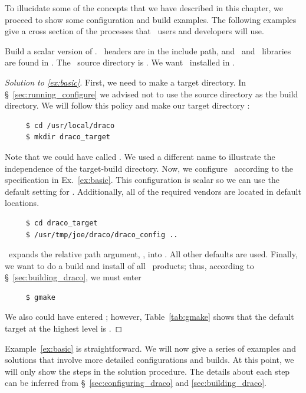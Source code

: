 To illucidate some of the concepts that we have described in this
chapter, we proceed to show some configuration and build examples.
The following examples give a cross section of the processes that
\draco\ users and developers will use.
\begin{cexa}
  \label{ex:basic}
  Build a scalar version of \draco.  \sprng\ headers are in the
   include path, and \sprng\ and \pcglib\ libraries are
  found in \ldlib.  The \draco\ source directory is
  .  We want \draco\ installed in
  .
\end{cexa}
\begin{proof}[Solution to \ref{ex:basic}]
  First, we need to make a target directory.  In
  \S~\ref{sec:running_configure} we advised not to use the source
  directory as the build directory.  We will follow this policy and
  make our target directory :
\begin{verbatim}
     $ cd /usr/local/draco
     $ mkdir draco_target
\end{verbatim}
  Note that we could have called 
  .  We used a different name to illustrate the
  independence of the target-build directory.  Now, we configure
  \draco\ according to the specification in Ex.~\ref{ex:basic}.  This
  configuration is scalar so we can use the default setting for
  \cfour.  Additionally, all of the required vendors are located in
  default locations.
\begin{verbatim}
     $ cd draco_target
     $ /usr/tmp/joe/draco/draco_config ..
\end{verbatim}
  \dracoconf\ expands the relative path argument, , into
  .  All other defaults are used.
  Finally, we want to do a build and install of all \draco\ products;
  thus, according to \S~\ref{sec:building_draco}, we must enter
\begin{verbatim}
     $ gmake
\end{verbatim} %
  We also could have entered ; however,
  Table~\ref{tab:gmake} shows that the default target at the highest
  level is .
\end{proof}

Example~\ref{ex:basic} is straightforward.  We will now give a series
of examples and solutions that involve more detailed configurations
and builds.  At this point, we will only show the steps in the
solution procedure.  The details about each step can be inferred from
\S~\ref{sec:configuring_draco} and \ref{sec:building_draco}.

